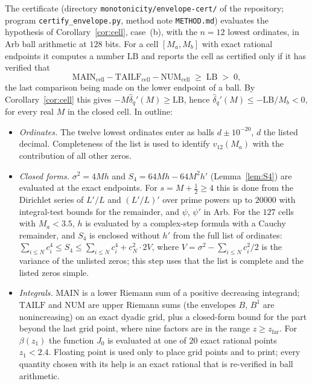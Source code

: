 \documentclass[11pt]{amsart}
\theoremstyle{definition}
\numberwithin{equation}{section}
\newcommand{\hd}{\widehat\delta}
\begin{document}
The certificate (directory \texttt{monotonicity/envelope-cert/} of the
repository; program \texttt{certify\_envelope.py}, method note
\texttt{METHOD.md}) evaluates the hypothesis of
Corollary~\ref{cor:cell}, case~(b), with the $n=12$ lowest ordinates,
in Arb ball arithmetic at $128$ bits. For a cell $[M_a,M_b]$ with
exact rational endpoints it computes a number
$\mathrm{LB}$ and reports the cell as certified only if it has verified
that
\[
\mathrm{MAIN}_{\mathrm{cell}}-\mathrm{TAILF}_{\mathrm{cell}}
-\mathrm{NUM}_{\mathrm{cell}}\;\ge\;\mathrm{LB}\;>\;0 ,
\]
the last comparison being made on the lower endpoint of a ball. By
Corollary~\ref{cor:cell} this gives $-M\hd_q'(M)\ge\mathrm{LB}$, hence
$\hd_q'(M)\le-\mathrm{LB}/M_b<0$, for every real $M$ in the closed
cell. In outline:
\begin{itemize}
\item \emph{Ordinates.} The twelve lowest ordinates enter as balls
$d\pm10^{-20}$, $d$ the listed decimal. Completeness of the list is
used to identify $v_{12}(M_a)$ with the contribution of all other
zeros.
\item \emph{Closed forms.} $\sigma^2=4Mh$ and $S_4=64Mh-64M^2h'$
(Lemma~\ref{lem:S4}) are evaluated at the exact endpoints. For
$s=M+\tfrac12\ge4$ this is done from the Dirichlet series of $L'/L$ and
$(L'/L)'$ over prime powers up to $20000$ with integral-test bounds
for the remainder, and $\psi$, $\psi'$ in Arb. For the $127$ cells
with $M_a<3.5$, $h$ is evaluated by a complex-step formula with a
Cauchy remainder, and $S_4$ is enclosed without $h'$ from the full
list of ordinates:
$\sum_{i\le N}c_i^4\le S_4\le\sum_{i\le N}c_i^4+c_N^2\cdot2V$, where
$V=\sigma^2-\sum_{i\le N}c_i^2/2$ is the variance of the unlisted
zeros; this step uses that the list is complete and the listed zeros
simple.
\item \emph{Integrals.} $\mathrm{MAIN}$ is a lower Riemann sum of a
positive decreasing integrand; $\mathrm{TAILF}$ and $\mathrm{NUM}$ are
upper Riemann sums (the envelopes $B$, $B^1$ are nonincreasing) on an
exact dyadic grid, plus a closed-form bound for the part beyond the
last grid point, where nine factors are in the range
$z\ge z_{\mathrm{far}}$. For $\beta(z_1)$ the function $J_0$ is
evaluated at one of $20$ exact rational points $z_1<2.4$. Floating
point is used only to place grid points and to print; every quantity
chosen with its help is an exact rational that is re-verified in ball
arithmetic.
\end{itemize}
\end{document}
